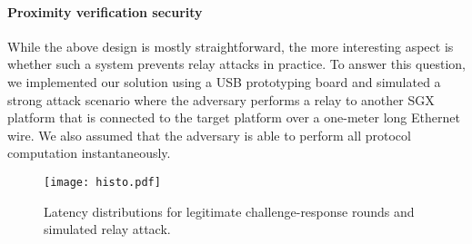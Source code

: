 


\paragraph{Proximity verification security} While the above design is mostly straightforward, the more interesting aspect is whether such a system prevents relay attacks in practice. To answer this question, we implemented our solution using a USB prototyping board and simulated a strong attack scenario where the adversary performs a relay to another SGX platform that is connected to the target platform over a one-meter long Ethernet wire. We also assumed that the adversary is able to perform all protocol computation instantaneously. 

\begin{figure}[t]
  \centering
    \texttt{[image: histo.pdf]} 
    \caption{Latency distributions for legitimate challenge-response rounds and simulated relay attack.}
    \label{graph:histogram}
\end{figure}

